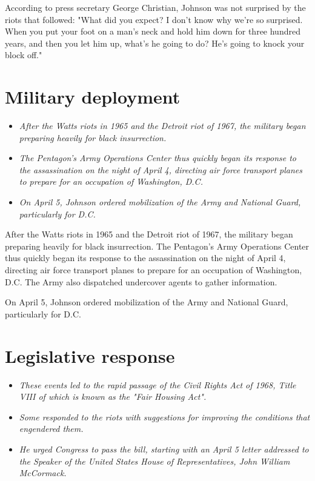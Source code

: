 According to press secretary George Christian, Johnson was not surprised
by the riots that followed: "What did you expect? I don't know why we're
so surprised. When you put your foot on a man's neck and hold him down
for three hundred years, and then you let him up, what's he going to do?
He's going to knock your block off."

\section{Military deployment}\label{military-deployment}

\begin{itemize}
\item
  \emph{After the Watts riots in 1965 and the Detroit riot of 1967, the
  military began preparing heavily for black insurrection.}
\item
  \emph{The Pentagon's Army Operations Center thus quickly began its
  response to the assassination on the night of April 4, directing air
  force transport planes to prepare for an occupation of Washington,
  D.C.}
\item
  \emph{On April 5, Johnson ordered mobilization of the Army and
  National Guard, particularly for D.C.}
\end{itemize}

After the Watts riots in 1965 and the Detroit riot of 1967, the military
began preparing heavily for black insurrection. The Pentagon's Army
Operations Center thus quickly began its response to the assassination
on the night of April 4, directing air force transport planes to prepare
for an occupation of Washington, D.C. The Army also dispatched
undercover agents to gather information.

On April 5, Johnson ordered mobilization of the Army and National Guard,
particularly for D.C.

\section{Legislative response}\label{legislative-response}

\begin{itemize}
\item
  \emph{These events led to the rapid passage of the Civil Rights Act of
  1968, Title VIII of which is known as the "Fair Housing Act".}
\item
  \emph{Some responded to the riots with suggestions for improving the
  conditions that engendered them.}
\item
  \emph{He urged Congress to pass the bill, starting with an April 5
  letter addressed to the Speaker of the United States House of
  Representatives, John William McCormack.}
\end{itemize}


